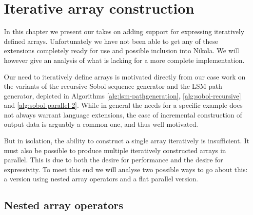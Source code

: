 \chapter{Iterative array construction}
\label{chap:unfold}


In this chapter we present our takes on adding support for expressing
iteratively defined arrays. Unfortunately we have not been able to get any of these
extensions completely ready for use and possible inclusion into Nikola.  We
will however give an analysis of what is lacking for a more complete
implementation.

Our need to iteratively define arrays is motivated directly from our
case work on the variants of the recursive Sobol-sequence generator
and the LSM path generator, depicted in Algorithms
\ref{alg:lsm-pathgeneration}, \ref{alg:sobol-recursive} and
\ref{alg:sobol-parallel-2}.  While in general the needs for a specific
example does not always warrant language extensions, the case of
incremental construction of output data is arguably a common one, and
thus well motivated.

But in isolation, the ability to construct a single array iteratively
is insufficient. It must also be possible to produce multiple
iteratively constructed arrays in parallel. This is due to both the
desire for performance and the desire for expressivity. To meet this
end we will analyse two possible ways to go about this: a version
using nested array operators and a flat parallel version.

\section{Nested array operators}

